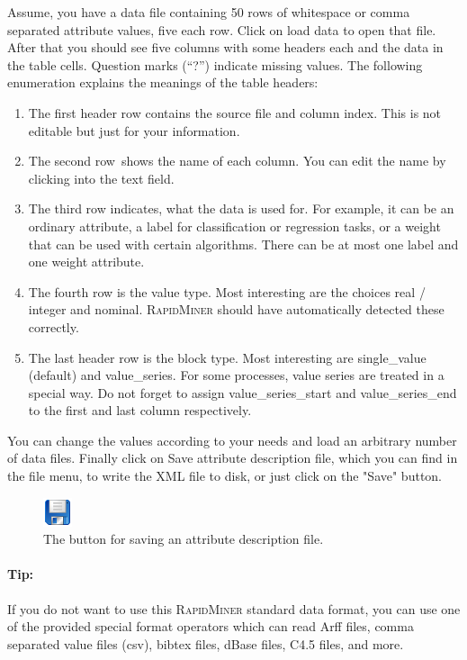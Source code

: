 \documentclass[11pt]{article}
\newcommand{\term}[1]{\textsf{#1}}
\newcommand{\useroption}[1]{\textsf{#1}}
\newcommand{\rapidminer}{\protect \textsc{RapidMiner}\xspace}
\begin{document}
Assume, you have a data file containing 50 rows of whitespace or comma
separated attribute values, five each  row. Click on load data to open
that file. After that you should see five columns with some headers each
and the data in the table cells. Question marks (``?'') indicate missing
values. The following enumeration explains the meanings of the table headers:
\begin{enumerate}
\item The first header row contains the source file and column index. This
  is not editable but just for your information.
\item The second row shows the name of each column. You can edit the name by
  clicking into the text field.
\item The third row indicates, what the data is used for. For example, it can
  be an ordinary attribute, a label for classification or
  regression tasks, or a weight that can be used with certain
  algorithms. There can be at most one label and one weight attribute.
\item The fourth row is the value type. Most interesting are
  the choices \term{real} / \term{integer} and \term{nominal}. \rapidminer
  should have automatically detected these correctly.
\item The last header row is the block type. Most interesting are
  \term{single\_value} (default) and \term{value\_series}. For some
  processes, value series are treated in a special way. Do not forget
  to assign \term{value\_series\_\-start} and \term{value\_series\_end} to
  the first and last column respectively.
\end{enumerate}
You can change the values according to your needs and load an
arbitrary number of data files. Finally click on \useroption{Save
attribute description file}, which you can find in the file menu,
to write the XML file to disk, or just click on the "Save" button.
\begin{figure}[ht]
\center
\includegraphics[width=0.08\linewidth]{save_button.png}
\caption{The button for saving an attribute description file.}
\label{fig:operator_delete}
\end{figure}

\paragraph{Tip:}
If you do not want to use this \rapidminer standard data format, you can use
one of the provided special format operators which can read Arff
files, comma separated value files (csv), bibtex files, dBase files,
C4.5 files, and more.
\end{document}
